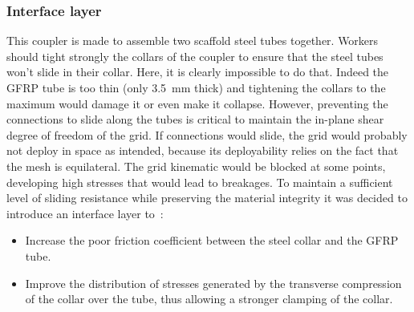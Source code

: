\subsubsection{Interface layer}
This coupler is made to assemble two scaffold steel tubes together. Workers should tight strongly the collars of the coupler to ensure that the steel tubes won't slide in their collar. Here, it is clearly impossible to do that. Indeed the GFRP tube is too thin (only \SI{3.5}{\mm} thick) and tightening the collars to the maximum would damage it or even make it collapse. However, preventing the connections to slide along the tubes is critical to maintain the in-plane shear degree of freedom of the grid. If connections would slide, the grid would probably not deploy in space as intended, because its deployability relies on the fact that the mesh is equilateral. The grid kinematic would be blocked at some points, developing high stresses that would lead to breakages. To maintain a sufficient level of sliding resistance while preserving the material integrity it was decided to introduce an interface layer to~:
\begin{itemize}
\item Increase the poor friction coefficient between the steel collar and the GFRP tube.
\item Improve the distribution of stresses generated by the transverse compression of the collar over the tube, thus allowing a stronger clamping of the collar.
\end{itemize}




